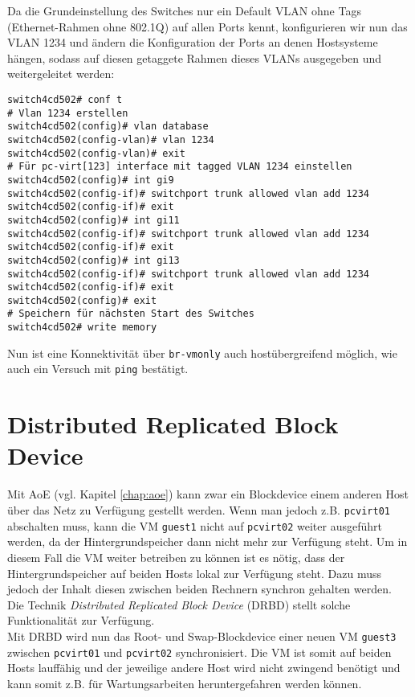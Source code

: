 Da die Grundeinstellung des Switches nur ein Default VLAN ohne Tags (Ethernet-Rahmen ohne 802.1Q) auf allen Ports kennt, konfigurieren wir nun das VLAN 1234 und ändern die Konfiguration der Ports an denen Hostsysteme hängen, sodass auf diesen getaggete Rahmen dieses VLANs ausgegeben und weitergeleitet werden:
\setupVerbatimOut
\begin{verbatim}
switch4cd502# conf t
# Vlan 1234 erstellen
switch4cd502(config)# vlan database 
switch4cd502(config-vlan)# vlan 1234
switch4cd502(config-vlan)# exit
# Für pc-virt[123] interface mit tagged VLAN 1234 einstellen 
switch4cd502(config)# int gi9 
switch4cd502(config-if)# switchport trunk allowed vlan add 1234
switch4cd502(config-if)# exit
switch4cd502(config)# int gi11
switch4cd502(config-if)# switchport trunk allowed vlan add 1234
switch4cd502(config-if)# exit
switch4cd502(config)# int gi13
switch4cd502(config-if)# switchport trunk allowed vlan add 1234
switch4cd502(config-if)# exit
switch4cd502(config)# exit
# Speichern für nächsten Start des Switches
switch4cd502# write memory
\end{verbatim}

Nun ist eine Konnektivität über \verb#br-vmonly# auch hostübergreifend möglich, wie auch ein Versuch mit \verb#ping# bestätigt. 

\chapter{Distributed Replicated Block Device}\label{chap:drbd}

Mit AoE (vgl. Kapitel \ref{chap:aoe}) kann zwar ein Blockdevice einem anderen Host über das Netz zu Verfügung gestellt werden. Wenn man jedoch z.B. \verb#pcvirt01# abschalten muss, kann die VM \verb#guest1# nicht auf \verb#pcvirt02# weiter ausgeführt werden, da der Hintergrundspeicher dann nicht mehr zur Verfügung steht. Um in diesem Fall die VM weiter betreiben zu können ist es nötig, dass der Hintergrundspeicher auf beiden Hosts lokal zur Verfügung steht. Dazu muss jedoch der Inhalt diesen zwischen beiden Rechnern synchron gehalten werden. Die Technik \emph{Distributed Replicated Block Device} (DRBD) stellt solche Funktionalität zur Verfügung. 
\\
Mit DRBD wird nun das Root- und Swap-Blockdevice einer neuen VM \verb#guest3# zwischen \verb#pcvirt01# und \verb#pcvirt02# synchronisiert. Die VM ist somit auf beiden Hosts lauffähig und der jeweilige andere Host wird nicht zwingend benötigt und kann somit z.B. für Wartungsarbeiten heruntergefahren werden können. 

